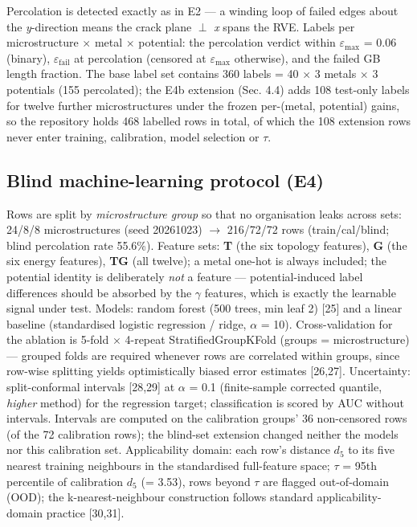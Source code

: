 \documentclass[preprint,12pt]{elsarticle}
\begin{document}
Percolation is detected exactly as in E2 --- a winding loop of failed edges about the \textit{y}-direction means the crack plane $\perp$ \textit{x} spans the RVE. Labels per microstructure $\times$ metal $\times$ potential: the percolation verdict within $\varepsilon_{\max}$ = 0.06 (binary), $\varepsilon_{\mathrm{fail}}$ at percolation (censored at $\varepsilon_{\max}$ otherwise), and the failed GB length fraction. The base label set contains 360 labels = 40 $\times$ 3 metals $\times$ 3 potentials (155 percolated); the E4b extension (Sec. 4.4) adds 108 test-only labels for twelve further microstructures under the frozen per-(metal, potential) gains, so the repository holds 468 labelled rows in total, of which the 108 extension rows never enter training, calibration, model selection or $\tau$.

\subsection{Blind machine-learning protocol (E4)}

Rows are split by \textit{microstructure group} so that no organisation leaks across sets: 24/8/8 microstructures (seed 20261023) $\rightarrow$ 216/72/72 rows (train/cal/blind; blind percolation rate 55.6\%). Feature sets: \textbf{T} (the six topology features), \textbf{G} (the six energy features), \textbf{TG} (all twelve); a metal one-hot is always included; the potential identity is deliberately \textit{not} a feature --- potential-induced label differences should be absorbed by the $\gamma$ features, which is exactly the learnable signal under test. Models: random forest (500 trees, min leaf 2) [25] and a linear baseline (standardised logistic regression / ridge, $\alpha$ = 10). Cross-validation for the ablation is 5-fold $\times$ 4-repeat StratifiedGroupKFold (groups = microstructure) --- grouped folds are required whenever rows are correlated within groups, since row-wise splitting yields optimistically biased error estimates [26,27]. Uncertainty: split-conformal intervals [28,29] at $\alpha$ = 0.1 (finite-sample corrected quantile, \textit{higher} method) for the regression target; classification is scored by AUC without intervals. Intervals are computed on the calibration groups' 36 non-censored rows (of the 72 calibration rows); the blind-set extension changed neither the models nor this calibration set. Applicability domain: each row's distance $d_5$ to its five nearest training neighbours in the standardised full-feature space; $\tau$ = 95th percentile of calibration $d_5$ (= 3.53), rows beyond $\tau$ are flagged out-of-domain (OOD); the k-nearest-neighbour construction follows standard applicability-domain practice [30,31].
\end{document}
